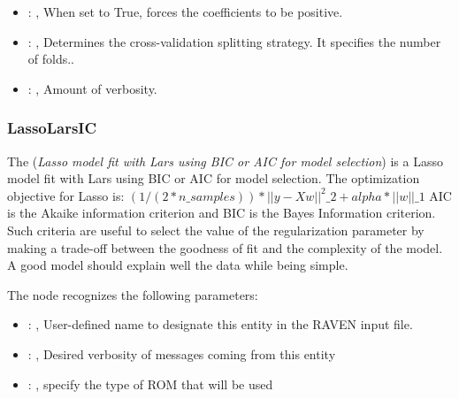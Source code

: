 \begin{itemize}
    \item {}: , 
      When set to True, forces the coefficients to be positive.

    \item {}: , 
      Determines the cross-validation splitting strategy.
      It specifies the number of folds..

    \item {}: , 
      Amount of verbosity.
  \end{itemize}


\subsubsection{LassoLarsIC}
  The  (\textit{Lasso model fit with Lars using BIC or AIC for model
  selection})                         is a Lasso model fit with Lars using BIC or AIC for model
  selection.                         The optimization objective for Lasso is:
  $(1 / (2 * n\_samples)) * ||y - Xw||^2\_2 + alpha * ||w||\_1$                         AIC is the
  Akaike information criterion and BIC is the Bayes Information criterion. Such criteria
  are useful to select the value of the regularization parameter by making a trade-off between the
  goodness of fit and the complexity of the model. A good model should explain well the data
  while being simple.                         

  The  node recognizes the following parameters:
    \begin{itemize}
      \item {}: , 
        User-defined name to designate this entity in the RAVEN input file.
      \item {}: , 
        Desired verbosity of messages coming from this entity
      \item {}: , 
        specify the type of ROM that will be used
  \end{itemize}

